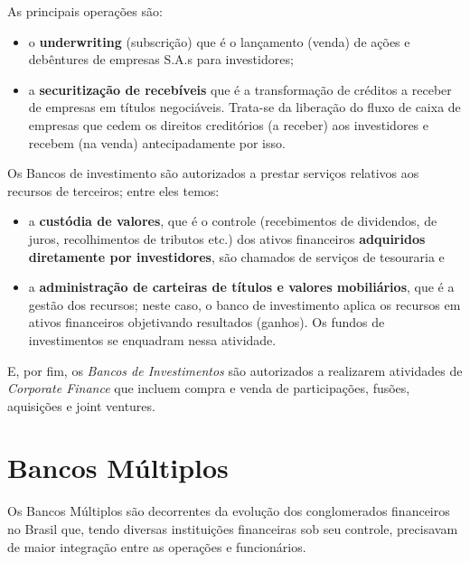 \documentclass{article}\usepackage[]{graphicx}\usepackage[]{xcolor}
\begin{document}
As principais operações são:

\begin{itemize}

  \item o \textbf{underwriting} (subscrição) que é o lançamento (venda) de ações e debêntures de empresas S.A.s para investidores;

  \item a \textbf{securitização de recebíveis} que é a transformação de créditos a receber de empresas
  em títulos negociáveis. Trata-se da liberação do fluxo de caixa de empresas que cedem os direitos
  creditórios (a receber) aos investidores e recebem (na venda) antecipadamente por isso.

\end{itemize}

Os Bancos de investimento são autorizados a prestar serviços relativos aos recursos de terceiros;  entre eles temos:

\begin{itemize}

  \item a \textbf{custódia de valores}, que é o controle (recebimentos de dividendos, de juros, recolhimentos
  de tributos etc.) dos ativos financeiros \textbf{adquiridos diretamente por investidores}, são chamados de serviços de tesouraria e

  \item a \textbf{administração de carteiras de títulos e valores mobiliários}, que é a gestão dos recursos;
  neste caso, o banco de investimento aplica os recursos em ativos financeiros objetivando resultados
  (ganhos). Os fundos de investimentos se enquadram nessa atividade.

\end{itemize}

E, por fim, os \textit{Bancos de Investimentos} são autorizados a realizarem atividades de \textit{Corporate Finance}
que incluem compra e venda de participações, fusões, aquisições e joint ventures.

\section*{Bancos Múltiplos}

Os Bancos Múltiplos são decorrentes da evolução dos conglomerados financeiros no Brasil que, tendo diversas
instituições financeiras sob seu controle, precisavam de maior integração entre as operações e funcionários.\par
\end{document}
